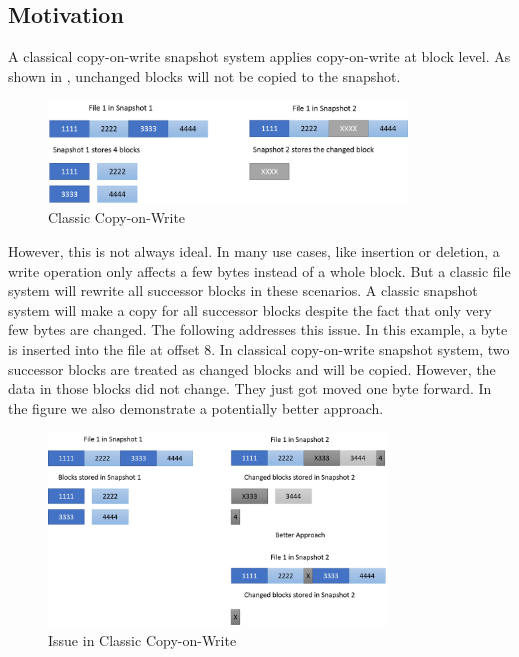 \subsection{Motivation}

    A classical copy-on-write snapshot system applies copy-on-write at block level. As shown in , unchanged blocks will not be copied to the snapshot.

\begin{figure}[t]
\centering
\includegraphics[width=0.85\textwidth]{Chapter-4/figs/fig4.png}
\caption{Classic Copy-on-Write}
\label{fig:classic_cow}
\end{figure}

    However, this is not always ideal. In many use cases, like insertion or deletion, a write operation only affects a few bytes instead of a whole block. But a classic file system will rewrite all successor blocks in these scenarios. A classic snapshot system will make a copy for all successor blocks despite the fact that only very few bytes are changed. The following  addresses this issue. In this example, a byte is inserted into the file at offset 8. In classical copy-on-write snapshot system, two successor blocks are treated as changed blocks and will be copied. However, the data in those blocks did not change. They just got moved one byte forward. In the figure we also demonstrate a potentially better approach.

\begin{figure}[t]
\centering
\includegraphics[width=0.8\textwidth]{Chapter-4/figs/fig5.png}
\caption{Issue in Classic Copy-on-Write}
\label{fig:issue_classic_cow}
\end{figure}
 
